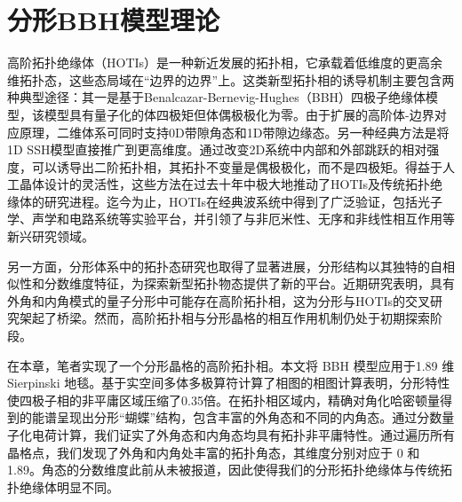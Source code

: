 \chapter{分形BBH模型理论}
高阶拓扑绝缘体（HOTIs）是一种新近发展的拓扑相，它承载着低维度的更高余维拓扑态，这些态局域在“边界的边界”上\cite{benalcazar2017quantized,langbehn2017reflection,song2017d,schindler2018higher,ezawa2018higher,trifunovic2019higher,xie2021higher}。这类新型拓扑相的诱导机制主要包含两种典型途径：其一是基于Benalcazar-Bernevig-Hughes（BBH）四极子绝缘体模型\cite{benalcazar2017quantized}，该模型具有量子化的体四极矩但体偶极极化为零。由于扩展的高阶体-边界对应原理，二维体系可同时支持0D带隙角态和1D带隙边缘态。另一种经典方法是将1D SSH模型直接推广到更高维度\cite{noh2018topological,ni2019observation,zhang2019second,xue2019acoustic,zhang2020low}。通过改变2D系统中内部和外部跳跃的相对强度，可以诱导出二阶拓扑相，其拓扑不变量是偶极极化，而不是四极矩。得益于人工晶体设计的灵活性，这些方法在过去十年中极大地推动了HOTIs及传统拓扑绝缘体\cite{hasan2010colloquium,qi2011topological}的研究进程。迄今为止，HOTIs在经典波系统中得到了广泛验证，包括光子学\cite{peterson2018quantized,xie2018second,chen2019direct,xie2019visualization,mittal2019photonic,ota2019photonic,el2019corner,he2020quadrupole,zhang2020higher,li2020higher}、声学\cite{serra2018observation,zhang2019dimensional,xue2019realization,qi2020acoustic,xue2020observation,weiner2020demonstration,ni2020demonstration}和电路系统\cite{imhof2018topolectrical,bao2019topoelectrical,zhang2019dimensional,liu2020octupole,zhang2021experimental}等实验平台，并引领了与非厄米性\cite{luo2019higher,gao2021non}、无序\cite{zhang2021experimental,chen2020higher,li2020topological}和非线性\cite{zangeneh2019nonlinear,kirsch2021nonlinear}相互作用等新兴研究领域。

另一方面，分形体系中的拓扑态研究也取得了显著进展\cite{song2014topological,iliasov2020hall,fremling2020existence,yang2020photonic}，分形结构以其独特的自相似性和分数维度特征\cite{mandelbrot1967coast}，为探索新型拓扑物态提供了新的平台。近期研究表明，具有外角和内角模式的量子分形中可能存在高阶拓扑相\cite{pai2019topological,manna2022higher}，这为分形与HOTIs的交叉研究架起了桥梁。然而，高阶拓扑相与分形晶格的相互作用机制仍处于初期探索阶段。

在本章，笔者实现了一个分形晶格的高阶拓扑相。本文将 BBH 模型应用于1.89 维 Sierpinski 地毯。基于实空间多体多极算符\cite{wheeler2019many,kang2019many}计算了相图的相图计算表明，分形特性使四极子相的非平庸区域压缩了0.35倍。在拓扑相区域内，精确对角化哈密顿量得到的能谱呈现出分形“蝴蝶”结构，包含丰富的外角态和不同的内角态。通过分数量子化电荷计算\cite{li2020fractional,peterson2021trapped,liu2021bulk}，我们证实了外角态和内角态均具有拓扑非平庸特性。通过遍历所有晶格点，我们发现了外角和内角处丰富的拓扑角态，其维度分别对应于 0 和 1.89。角态的分数维度此前从未被报道，因此使得我们的分形拓扑绝缘体与传统拓扑绝缘体明显不同。
